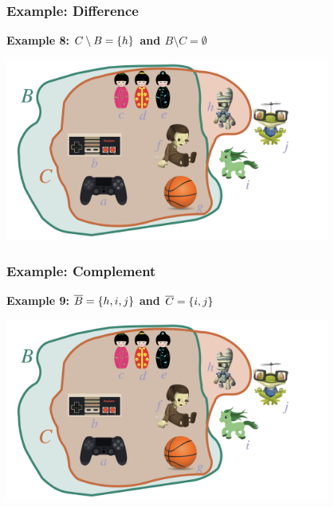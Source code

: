 \documentclass[fleqn,10pt,serif,xcolor=svgnames,xcolor=table,aspectratio=169,handout]{beamer}
\begin{document}
\begin{frame}
  \frametitle{Example: Difference}

  \hfill \textbf{Example 8: $C \setminus B = \left\{h\right\}$ and $B \setminus C = \emptyset$} \\

  \bigskip

  \hfill \includegraphics[width = 0.8\textwidth]{01b-sets-relations-operations/01b-sets-relations-operations-002.jpeg}

\end{frame}

\begin{frame}
  \frametitle{Example: Complement}

  \hfill \textbf{Example 9: $\overline{B} = \left\{h, i , j\right\}$ and $\overline{C} = \left\{i,j\right\}$} \\

  \bigskip

  \hfill \includegraphics[width = 0.8\textwidth]{01b-sets-relations-operations/01b-sets-relations-operations-002.jpeg}

\end{frame}
\end{document}
